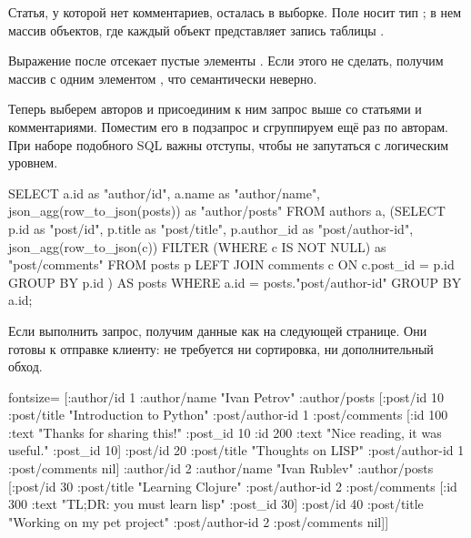 Статья, у которой нет комментариев, осталась в выборке. Поле  носит тип ; в нем массив объектов, где каждый объект представляет запись таблицы .

Выражение  после  отсекает пустые элементы . Если этого не сделать, получим массив с одним элементом , что семантически неверно.

Теперь выберем авторов и присоединим к ним запрос выше со статьями и комментариями. Поместим его в подзапрос и сгруппируем ещё раз по авторам. При наборе подобного SQL важны отступы, чтобы не запутаться с логическим уровнем.

\begin{english}
  \begin{sql}
SELECT
  a.id                         as "author/id",
  a.name                       as "author/name",
  json_agg(row_to_json(posts)) as "author/posts"
FROM
  authors a,
  (SELECT
    p.id        as "post/id",
    p.title     as "post/title",
    p.author_id as "post/author-id",
    json_agg(row_to_json(c)) FILTER
            (WHERE c IS NOT NULL) as "post/comments"
  FROM posts p
  LEFT JOIN comments c ON c.post_id = p.id
  GROUP BY p.id
) AS posts
WHERE a.id = posts."post/author-id"
GROUP BY a.id;
  \end{sql}
\end{english}

Если выполнить запрос, получим данные как на следующей странице. Они готовы к отправке клиенту: не требуется ни сортировка, ни дополнительный обход.

\begin{english}
  \begin{clojure*}{fontsize=\small}
[{:author/id 1
  :author/name "Ivan Petrov"
  :author/posts
    [{:post/id 10
      :post/title "Introduction to Python"
      :post/author-id 1
      :post/comments
        [{:id 100
          :text "Thanks for sharing this!"
          :post_id 10}
         {:id 200
          :text "Nice reading, it was useful."
          :post_id 10}]}
     {:post/id 20
      :post/title "Thoughts on LISP"
      :post/author-id 1
      :post/comments nil}]}
 {:author/id 2
  :author/name "Ivan Rublev"
  :author/posts
    [{:post/id 30
      :post/title "Learning Clojure"
      :post/author-id 2
      :post/comments
        [{:id 300
          :text "TL;DR: you must learn lisp"
          :post_id 30}]}
     {:post/id 40
      :post/title "Working on my pet project"
      :post/author-id 2
      :post/comments nil}]}]
  \end{clojure*}
\end{english}


